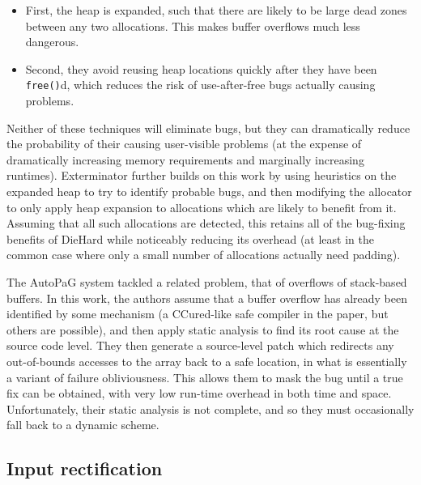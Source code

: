 \begin{itemize}
\item First, the heap is expanded, such that there are likely to be
  large dead zones between any two allocations.  This makes buffer
  overflows much less dangerous.
\item Second, they avoid reusing heap locations quickly after they
  have been \texttt{free()}d, which reduces the risk of use-after-free
  bugs actually causing problems.
\end{itemize}

Neither of these techniques will eliminate bugs, but they can
dramatically reduce the probability of their causing user-visible
problems (at the expense of dramatically increasing memory
requirements and marginally increasing runtimes).
Exterminator\cite{Novark2007} further builds on this work by using
heuristics on the expanded heap to try to identify probable bugs, and
then modifying the allocator to only apply heap expansion to
allocations which are likely to benefit from it.  Assuming that all
such allocations are detected, this retains all of the bug-fixing
benefits of DieHard while noticeably reducing its overhead (at least
in the common case where only a small number of allocations actually
need padding).

The AutoPaG system\cite{Lin2007} tackled a related problem, that of
overflows of stack-based buffers.  In this work, the authors assume
that a buffer overflow has already been identified by some mechanism
(a CCured\cite{Necula2005}-like safe compiler in the paper, but others
are possible), and then apply static analysis to find its root cause
at the source code level.  They then generate a source-level patch
which redirects any out-of-bounds accesses to the array back to a safe
location, in what is essentially a variant of failure obliviousness.
This allows them to mask the bug until a true fix can be obtained,
with very low run-time overhead in both time and space.
Unfortunately, their static analysis is not complete, and so they
must occasionally fall back to a dynamic scheme.

\subsection{Input rectification}

